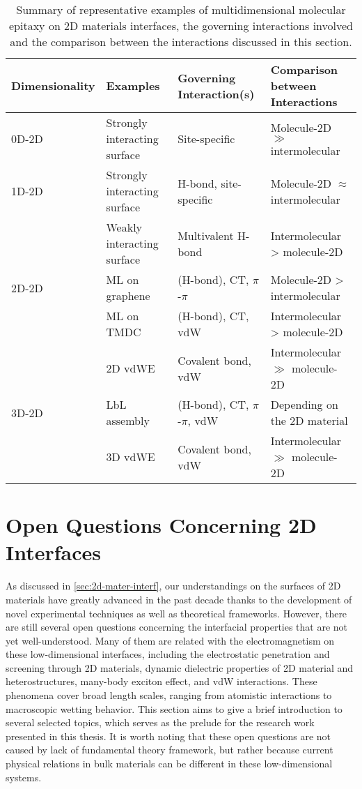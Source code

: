 \begin{table}[!htbp]
  \centering
  \caption{\label{tbl:intro-summary-multidimension}%
    Summary of representative examples of multidimensional molecular
    epitaxy on 2D materials interfaces, the governing interactions
    involved and the comparison between the interactions discussed in
    this section.               %
  }
  \small
\begin{tabularx}{1.0\textwidth}{XXXX}
\hline
Dimensionality & Examples & Governing Interaction(s) & Comparison between Interactions\\
\hline
0D-2D & Strongly interacting surface & Site-specific & Molecule-2D \(\gg\) intermolecular\\
\hline
1D-2D & Strongly interacting surface & H-bond,  site-specific & Molecule-2D \(\approx\) intermolecular\\
 & Weakly interacting surface & Multivalent H-bond & Intermolecular  \textgreater{} molecule-2D\\
\hline
2D-2D & ML on graphene & (H-bond), CT, \(\pi\)-\(\pi\) & Molecule-2D > intermolecular\\
 & ML on TMDC & (H-bond), CT, vdW & Intermolecular  \textgreater{} molecule-2D\\
 & 2D vdWE & Covalent bond,   vdW & Intermolecular  \(\gg\)  molecule-2D\\
\hline
3D-2D & LbL assembly & (H-bond), CT, \(\pi\)-\(\pi\), vdW & Depending on the 2D material\\
 & 3D vdWE & Covalent bond,   vdW & Intermolecular \(\gg\) molecule-2D\\
\hline
\end{tabularx}
\end{table}




\section{Open Questions Concerning 2D Interfaces}
\label{sec:chall-probl-conc}

As discussed in \autoref{sec:2d-mater-interf}, our understandings on
the surfaces of 2D materials have greatly advanced in the past decade
thanks to the development of novel experimental techniques as well as
theoretical frameworks.
%
However, there are still several open questions concerning the
interfacial properties that are not yet well-understood. Many of them 
are related with the electromagnetism on these low-dimensional
interfaces, including the electrostatic penetration and screening
through 2D materials, dynamic dielectric properties of 2D material and
heterostructures, many-body exciton effect, and vdW interactions.
%
These phenomena cover broad length scales, ranging from atomistic
interactions to macroscopic wetting behavior.
%
This section aims to give a brief introduction to several selected
topics, which serves as the prelude for the research
work presented in this thesis.
%
It is worth noting that these open questions are not caused by lack of
fundamental theory framework, but rather because current physical
relations in bulk materials can be different in these
low-dimensional systems.

